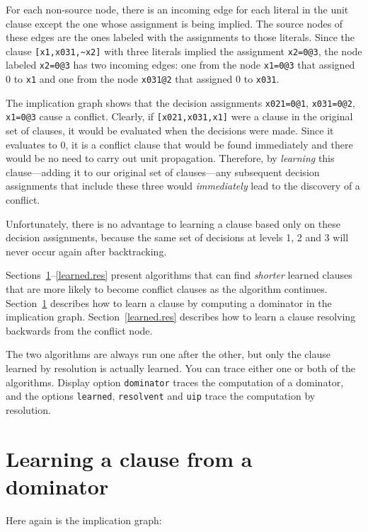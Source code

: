 \documentclass[11pt]{report}
\newcommand*{\p}[1]{\textup{\texttt{#1}}}
\begin{document}
For each non-source node, there is an incoming edge for each literal in
the unit clause except the one whose assignment is being implied. The
source nodes of these edges are the ones labeled with the assignments to
those literals. Since the clause \verb+[x1,x031,~x2]+ with three
literals implied the assignment \p{x2=0@3}, the node labeled \p{x2=0@3}
has two incoming edges: one from the node \p{x1=0@3} that assigned 0 to
\p{x1} and one from the node \p{x031@2} that assigned 0 to \p{x031}.

The implication graph shows that the decision assignments \p{x021=0@1},
\p{x031=0@2}, \p{x1=0@3} cause a conflict. Clearly, if
\verb+[x021,x031,x1]+ were a clause in the original set of clauses, it
would be evaluated when the decisions were made. Since it evaluates to
0, it is a conflict clause that would be found immediately and there
would be no need to carry out unit propagation. Therefore, by
\emph{learning} this clause---adding it to our original set of
clauses---any subsequent decision assignments that include these three
would \emph{immediately} lead to the discovery of a conflict.

Unfortunately, there is no advantage to learning a clause based only on
these decision assignments, because the same set of decisions at levels
1, 2 and 3 will never occur again after backtracking.

Sections~\ref{learned.dom}--\ref{learned.res} present algorithms that
can find \emph{shorter} learned clauses that are more likely to become
conflict clauses as the algorithm continues. Section~\ref{learned.dom}
describes how to learn a clause by computing a dominator in the
implication graph. Section~\ref{learned.res} describes how to learn a
clause resolving backwards from the conflict node.

The two algorithms are always run one after the other, but only the
clause learned by resolution is actually learned. You can trace either
one or both of the algorithms. Display option \p{dominator} traces the
computation of a dominator, and the options \p{learned}, \p{resolvent}
and \p{uip} trace the computation by resolution.

\newpage

\section{Learning a clause from a dominator}\label{learned.dom}

Here again is the implication graph:
\end{document}
